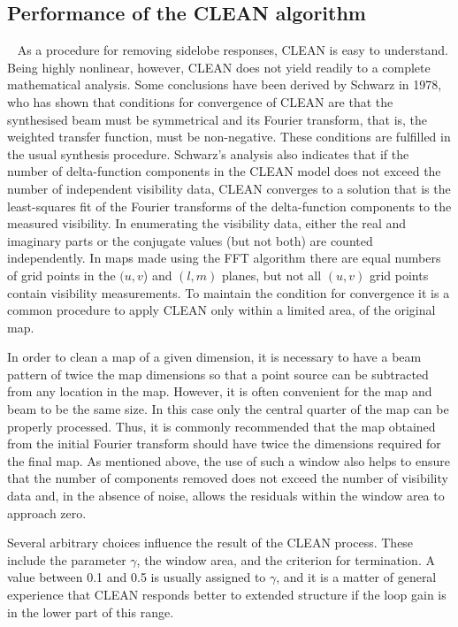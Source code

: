 \subsection{Performance of the CLEAN algorithm}
\label{sec:cleanPerf}
~\citep[From Pgs.~429-432]{thompson2008interferometry}
As a procedure for removing sidelobe responses, CLEAN is easy to understand. Being highly nonlinear, however, CLEAN does not yield readily to a complete mathematical analysis. Some conclusions have been derived by Schwarz in 1978, who has shown that conditions for convergence of CLEAN are that the synthesised beam must be symmetrical and its Fourier transform, that is, the weighted transfer function, must be non-negative. These conditions are fulfilled in the usual synthesis procedure. Schwarz’s analysis also indicates that if the number of delta-function components in the CLEAN model does not exceed the number of independent visibility data, CLEAN converges to a solution that is the least-squares fit of the Fourier transforms of the delta-function components to the measured visibility. In enumerating the visibility data, either the real and imaginary parts or the conjugate values (but not both) are counted independently. In maps made using the FFT algorithm there are equal numbers of grid points in the $(u,v$) and $(l, m)$ planes, but not all $(u,v)$ grid points contain visibility measurements. To maintain the condition for convergence it is a common procedure to
apply CLEAN only within a limited area, of the original map.

In order to clean a map of a given dimension, it is necessary to have a beam pattern of twice the map dimensions so that a point source can be subtracted from any location in the map. However, it is often convenient for the map and beam to be the same size. In this case only the central quarter of the map can be properly processed. Thus, it is commonly recommended that the map obtained from the initial Fourier transform should have twice the dimensions required for the final map. As mentioned above, the use of such a window also helps to ensure that the number of components removed does not exceed the number of visibility data and, in the absence of noise, allows the residuals within the window area to approach zero.

Several arbitrary choices influence the result of the CLEAN process. These
include the parameter $\gamma$, the window area, and the criterion for termination. A value between 0.1 and 0.5 is usually assigned to $\gamma$, and it is a matter of general experience that CLEAN responds better to extended structure if the loop gain is in the lower part of this range.

